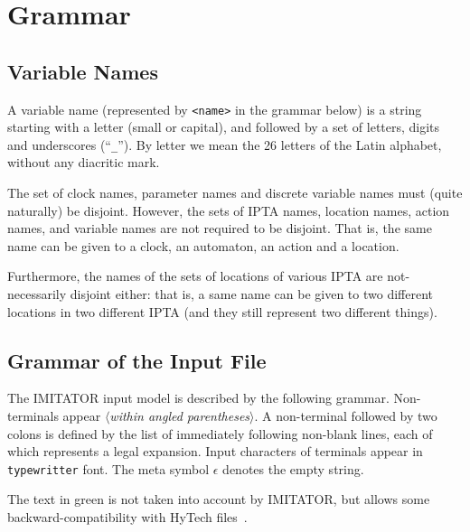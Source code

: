 \documentclass[a4paper,11pt]{report}
\newcommand{\emptystring}{$\epsilon$}
\newcommand{\hytech}{{\sc HyTech}}
\newcommand{\imitator}{\textsf{IMITATOR}}
\newcommand{\IPTA}{IPTA}
\newcommand{\nt}[1]{$\langle$\emph{#1}$\rangle$}
\newcommand{\npec}[1]{\textcolor{green!50!black}{#1}}
\newcommand{\styleIMI}[1]{\textcolor{imicolor}{\texttt{#1}}}
\begin{document}
\chapter{Grammar}\label{chapter:grammar}


\section{Variable Names}

A variable name (represented by \styleIMI{<name>} in the grammar below) is a string starting with a letter (small or capital), and followed by a set of letters, digits and underscores (``\styleIMI{\_}'').
By letter we mean the 26 letters of the Latin alphabet, without any diacritic mark.

The set of clock names, parameter names and discrete variable names must (quite naturally) be disjoint.
However, the sets of \IPTA{} names, location names, action names, and variable names are not required to be disjoint.
That is, the same name can be given to a clock, an automaton, an action and a location.

Furthermore, the names of the sets of locations of various \IPTA{} are not-necessarily disjoint either: that is, a same name can be given to two different locations in two different \IPTA{} (and they still represent two different things).


\section{Grammar of the Input File}

The \imitator{} input model is described by the following grammar.
Non-terminals appear \nt{within angled parentheses}.
A non-terminal followed by two colons is defined by the list of immediately following non-blank lines, each of which represents a legal expansion.
Input characters of terminals appear in \styleIMI{typewritter} font.
The meta symbol \emptystring{} denotes the empty string.

The text \npec{in green} is not taken into account by \imitator{}, but allows some backward-compatibility with \hytech{} files~\cite{HHW95}.
\end{document}
